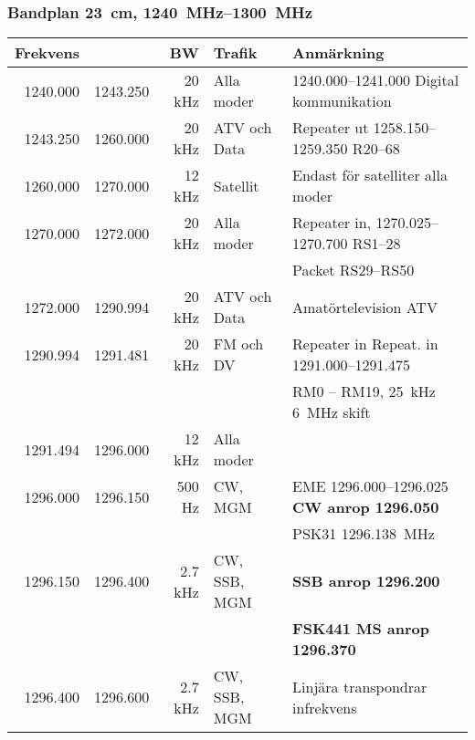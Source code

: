 \subsubsection{Bandplan \SI{23}{\centi\metre}, \SIrange{1240}{1300}{\mega\hertz}}
\begin{tabular}{rrrll}
	\textbf{Frekvens} &          & \textbf{BW} & \textbf{Trafik} & \textbf{Anmärkning}          \\ \hline

1240.000 & 1243.250 & 20 kHz  & Alla moder   & \numrange{1240,000}{1241,000} Digital kommunikation           \\ \hline
1243.250 & 1260.000 & 20 kHz  & ATV och Data & Repeater ut \numrange{1258,150}{1259,350}  R20--68            \\ \hline
1260.000 & 1270.000 & 12 kHz  & Satellit     & Endast för satelliter alla moder                              \\ \hline
1270.000 & 1272.000 & 20 kHz  & Alla moder   & Repeater in, \numrange{1270,025}{1270,700} RS1--28            \\
	 &          &         &              & Packet RS29--RS50                                             \\ \hline
1272.000 & 1290.994 & 20 kHz  & ATV och Data & Amatörtelevision ATV                                          \\ \hline
1290.994 & 1291.481 & 20 kHz  & FM och DV    & Repeater in Repeat. in \numrange{1291,000}{1291,475}          \\
	 &          &         &              & RM0 – RM19, \SI{25}{\kilo\hertz} \SI{6}{\mega\hertz} skift    \\ \hline
1291.494 & 1296.000 & 12 kHz  & Alla moder   &                                                               \\ \hline
1296.000 & 1296.150 & 500 Hz  & CW,  MGM     & EME \numrange{1296,000}{1296,025} \textbf{CW anrop 1296.050}  \\
	 &          &         &              & PSK31 \SI{1296,138}{\mega\hertz}                              \\ \hline
1296.150 & 1296.400 & 2.7 kHz & CW, SSB, MGM & \textbf{SSB anrop \num{1296,200}}                             \\
	 &          &         &              & \textbf{FSK441 MS anrop \num{1296,370}}                       \\ \hline
1296.400 & 1296.600 & 2.7 kHz & CW, SSB, MGM & Linjära transpondrar infrekvens                               \\ \hline

\end{tabular}
